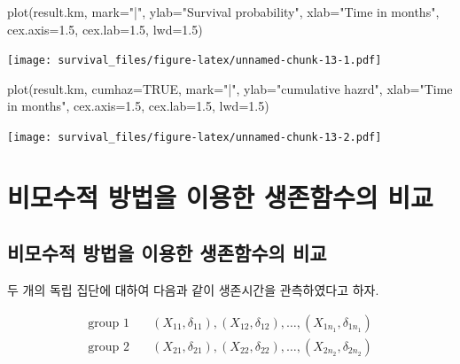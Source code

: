 \documentclass[
]{book}
\newenvironment{Shaded}{\begin{snugshade}}{\end{snugshade}}
\newcommand{\AttributeTok}[1]{\textcolor[rgb]{0.77,0.63,0.00}{#1}}
\newcommand{\ConstantTok}[1]{\textcolor[rgb]{0.00,0.00,0.00}{#1}}
\newcommand{\FloatTok}[1]{\textcolor[rgb]{0.00,0.00,0.81}{#1}}
\newcommand{\FunctionTok}[1]{\textcolor[rgb]{0.00,0.00,0.00}{#1}}
\newcommand{\NormalTok}[1]{#1}
\newcommand{\StringTok}[1]{\textcolor[rgb]{0.31,0.60,0.02}{#1}}
\theoremstyle{definition}
\theoremstyle{definition}
\theoremstyle{definition}
\theoremstyle{definition}
\theoremstyle{remark}
\begin{document}
\begin{Shaded}
\begin{Highlighting}[]
\FunctionTok{plot}\NormalTok{(result.km, }\AttributeTok{mark=}\StringTok{"|"}\NormalTok{, }\AttributeTok{ylab=}\StringTok{"Survival probability"}\NormalTok{, }\AttributeTok{xlab=}\StringTok{"Time in months"}\NormalTok{,}
     \AttributeTok{cex.axis=}\FloatTok{1.5}\NormalTok{, }\AttributeTok{cex.lab=}\FloatTok{1.5}\NormalTok{, }\AttributeTok{lwd=}\FloatTok{1.5}\NormalTok{)}
\end{Highlighting}
\end{Shaded}

\texttt{[image: survival\_files/figure-latex/unnamed-chunk-13-1.pdf]}

\begin{Shaded}
\begin{Highlighting}[]
\FunctionTok{plot}\NormalTok{(result.km, }\AttributeTok{cumhaz=}\ConstantTok{TRUE}\NormalTok{, }\AttributeTok{mark=}\StringTok{"|"}\NormalTok{, }\AttributeTok{ylab=}\StringTok{"cumulative hazrd"}\NormalTok{, }\AttributeTok{xlab=}\StringTok{"Time in months"}\NormalTok{,  }\AttributeTok{cex.axis=}\FloatTok{1.5}\NormalTok{, }\AttributeTok{cex.lab=}\FloatTok{1.5}\NormalTok{, }\AttributeTok{lwd=}\FloatTok{1.5}\NormalTok{)}
\end{Highlighting}
\end{Shaded}

\texttt{[image: survival\_files/figure-latex/unnamed-chunk-13-2.pdf]}

\hypertarget{logrank}{%
\chapter{비모수적 방법을 이용한 생존함수의 비교}\label{logrank}}

\hypertarget{uxbe44uxbaa8uxc218uxc801-uxbc29uxbc95uxc744-uxc774uxc6a9uxd55c-uxc0dduxc874uxd568uxc218uxc758-uxbe44uxad50}{%
\section{비모수적 방법을 이용한 생존함수의 비교}\label{uxbe44uxbaa8uxc218uxc801-uxbc29uxbc95uxc744-uxc774uxc6a9uxd55c-uxc0dduxc874uxd568uxc218uxc758-uxbe44uxad50}}

두 개의 독립 집단에 대하여 다음과 같이 생존시간을 관측하였다고 하자.

\begin{align*}
\text{group 1} \quad & (X_{11}, \delta_{11}), (X_{12}, \delta_{12}) , \dots ,(X_{1 n_1}, \delta_{1 n_1}) \\
\text{group 2} \quad & (X_{21}, \delta_{21}), (X_{22}, \delta_{22}) , \dots ,(X_{2 n_2}, \delta_{2 n_2}) \\
\end{align*}
\end{document}
